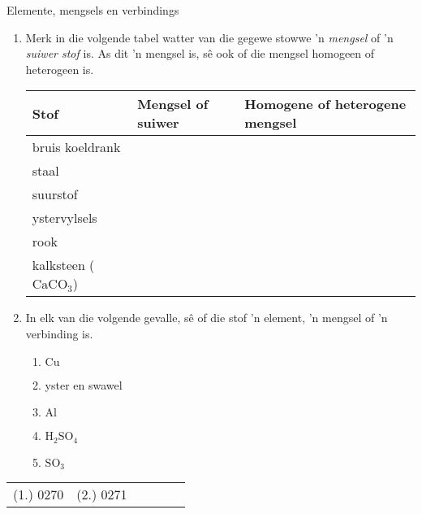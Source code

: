             \begin{exercises}{Elemente, mengsels en verbindings}{
            \nopagebreak
            \label{m38708*id63472}
 \begin{enumerate}[noitemsep, label=\textbf{\arabic*}. ] 
            \label{m38708*uid28}
    \item Merk in die volgende tabel watter van die gegewe stowwe 'n \textsl{mengsel} of 'n \textsl{suiwer stof} is. As dit 'n mengsel is, sê ook of die mengsel homogeen of heterogeen is.
          \begin{table}[H]
        \begin{center}
      \label{m38708*id63499}
    \noindent
      \begin{tabular}{|l|l|l|}\hline
        \textbf{Stof} &
        \textbf{Mengsel of suiwer} &
        \textbf{Homogene of heterogene mengsel} \\ \hline
        bruis koeldrank & & \\ \hline
        staal & & \\ \hline
        suurstof & & \\ \hline
        ystervylsels & & \\ \hline
        rook & & \\ \hline
        kalksteen (${\text{CaCO}}_{3}$) & & \\ \hline
    \end{tabular}
      \end{center}
\end{table}
    \par
\label{m38708*uid29}\item In elk van die volgende gevalle, sê of die stof 'n element, 'n mengsel of 'n verbinding is.
\label{m38708*id63912}\begin{enumerate}[noitemsep, label=\textbf{\alph*}. ] 
            \label{m38708*uid30}\item $\text{Cu}$
\label{m38708*uid31}\item yster en swawel
\label{m38708*uid32}\item $\text{Al}$
\label{m38708*uid33}\item $\text{H}{}_{2}\text{SO}{}_{4}$
\label{m38708*uid34}\item $\text{SO}{}_{3}$\end{enumerate}
                \end{enumerate}

\practiceinfo
\begin{tabular}[h]{cccccc}
 (1.) 0270  &  (2.) 0271  & 
\end{tabular}
}
\end{exercises}
